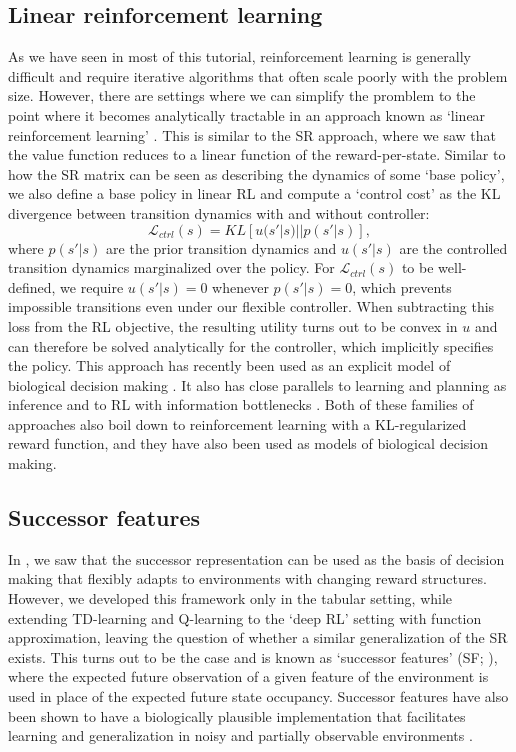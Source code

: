 \subsection{Linear reinforcement learning}
\label{sec:linear_RL}
As we have seen in most of this tutorial, reinforcement learning is generally difficult and require iterative algorithms that often scale poorly with the problem size.
However, there are settings where we can simplify the promblem to the point where it becomes analytically tractable in an approach known as `linear reinforcement learning' \citep{todorov2006linearly, todorov2009efficient}.
This is similar to the SR approach, where we saw that the value function reduces to a linear function of the reward-per-state.
Similar to how the SR matrix can be seen as describing the dynamics of some `base policy', we also define a base policy in linear RL and compute a `control cost' as the KL divergence between transition dynamics with and without controller:
\begin{equation}
    \mathcal{L}_{ctrl}(s) = KL \left [ u(s' | s) || p(s'|s) \right ],
\end{equation}
where $p(s' | s)$ are the prior transition dynamics and $u(s' | s)$ are the controlled transition dynamics marginalized over the policy.
For $\mathcal{L}_{ctrl}(s)$ to be well-defined, we require $u(s'|s) = 0$ whenever $p(s'|s) = 0$, which prevents impossible transitions even under our flexible controller.
When subtracting this loss from the RL objective, the resulting utility turns out to be convex in $u$ and can therefore be solved analytically for the controller, which implicitly specifies the policy.
This approach has recently been used as an explicit model of biological decision making \citep{piray2021linear}.
It also has close parallels to learning and planning as inference \citep{levine2018reinforcement, solway2012goal,botvinick2012planning} and to RL with information bottlenecks \citep{lai2021policy}.
Both of these families of approaches also boil down to reinforcement learning with a KL-regularized reward function, and they have also been used as models of biological decision making.

\subsection{Successor features}
\label{sec:SFs}
In , we saw that the successor representation can be used as the basis of decision making that flexibly adapts to environments with changing reward structures.
However, we developed this framework only in the tabular setting, while extending TD-learning and Q-learning to the `deep RL' setting with function approximation, leaving the question of whether a similar generalization of the SR exists.
This turns out to be the case and is known as `successor features' (SF; \citealp{barreto2017successor}), where the expected future observation of a given feature of the environment is used in place of the expected future state occupancy.
Successor features have also been shown to have a biologically plausible implementation that facilitates learning and generalization in noisy and partially observable environments \citep{vertes2019neurally}.

